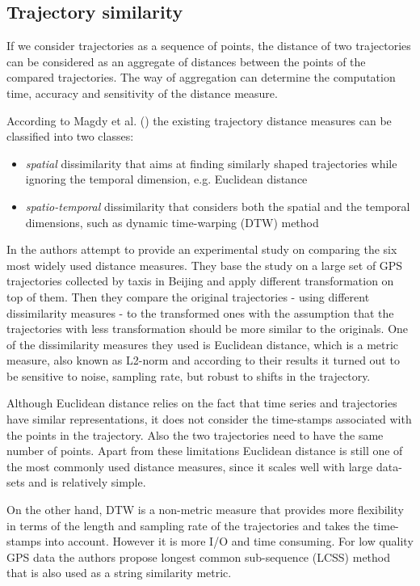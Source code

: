 \subsection{Trajectory similarity}
If we consider trajectories as a sequence of points, the distance of two trajectories can be considered as an aggregate of distances between the points of the compared trajectories. The way of aggregation can determine the computation time, accuracy and sensitivity of the distance measure.

According to Magdy et al. (\cite{traj-sim-rev}) the existing trajectory distance measures can be classified into two classes: 
\begin{itemize}
    \item \textit{spatial} dissimilarity that aims at finding similarly  shaped trajectories while ignoring the temporal dimension, e.g. Euclidean distance
    \item \textit{spatio-temporal} dissimilarity that considers both the spatial and the temporal dimensions, such as dynamic time-warping (DTW) method
\end{itemize}

In \cite{traj-sim} the authors attempt to provide an experimental study on comparing the six most widely used distance measures. They base the study on a large set of GPS trajectories collected by taxis in Beijing and apply different transformation on top of them. Then they compare the original trajectories - using different dissimilarity measures - to the transformed ones with the assumption that the trajectories with less transformation should be more similar to the originals. One of the dissimilarity measures they used is Euclidean distance, which is a metric measure, also known as L2-norm and according to their results it turned out to be sensitive to noise, sampling rate, but robust to shifts in the trajectory.

Although Euclidean distance relies on the fact that time series and trajectories have similar representations, it does not consider the time-stamps associated with the points in the trajectory. Also the two trajectories need to have the same number of points. Apart from these limitations Euclidean distance is still one of the most commonly used distance measures, since it scales well with large data-sets and is relatively simple. 

On the other hand, DTW is a non-metric measure that provides more flexibility in terms of the length and sampling rate of the trajectories and takes the time-stamps into account. However it is more I/O and time consuming. For low quality GPS data the authors propose longest common sub-sequence (LCSS) method that is also used as a string similarity metric.

